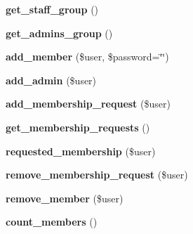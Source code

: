 \begin{DoxyCompactItemize}
\item 
\hypertarget{classkoala__group_a375df91df22400f9234d32fe74c134d3}{
{\bfseries get\_\-staff\_\-group} ()}
\label{classkoala__group_a375df91df22400f9234d32fe74c134d3}

\item 
\hypertarget{classkoala__group_a481518caa4920ff28589a97c4417db7a}{
{\bfseries get\_\-admins\_\-group} ()}
\label{classkoala__group_a481518caa4920ff28589a97c4417db7a}

\item 
\hypertarget{classkoala__group_a5d31f09207e8789022b4ad2a05b5cf39}{
{\bfseries add\_\-member} (\$user, \$password=\char`\"{}\char`\"{})}
\label{classkoala__group_a5d31f09207e8789022b4ad2a05b5cf39}

\item 
\hypertarget{classkoala__group_a78384417bee7cc5d448433409f7e05e5}{
{\bfseries add\_\-admin} (\$user)}
\label{classkoala__group_a78384417bee7cc5d448433409f7e05e5}

\item 
\hypertarget{classkoala__group_a0a294c6d770bd56466fa446117156f6e}{
{\bfseries add\_\-membership\_\-request} (\$user)}
\label{classkoala__group_a0a294c6d770bd56466fa446117156f6e}

\item 
\hypertarget{classkoala__group_a01d60e46d9b729c2c989f4a060c6d895}{
{\bfseries get\_\-membership\_\-requests} ()}
\label{classkoala__group_a01d60e46d9b729c2c989f4a060c6d895}

\item 
\hypertarget{classkoala__group_a1366e39b8e41df66b725afcda693a8a8}{
{\bfseries requested\_\-membership} (\$user)}
\label{classkoala__group_a1366e39b8e41df66b725afcda693a8a8}

\item 
\hypertarget{classkoala__group_a783ae9335f9687fcc5af512d60e08a3e}{
{\bfseries remove\_\-membership\_\-request} (\$user)}
\label{classkoala__group_a783ae9335f9687fcc5af512d60e08a3e}

\item 
\hypertarget{classkoala__group_a7a6a27725a93fd5d2fe7b2a666a8e6ea}{
{\bfseries remove\_\-member} (\$user)}
\label{classkoala__group_a7a6a27725a93fd5d2fe7b2a666a8e6ea}

\item 
\hypertarget{classkoala__group_a17deee420a17af078e5053e121082773}{
{\bfseries count\_\-members} ()}
\label{classkoala__group_a17deee420a17af078e5053e121082773}


\end{DoxyCompactItemize}
